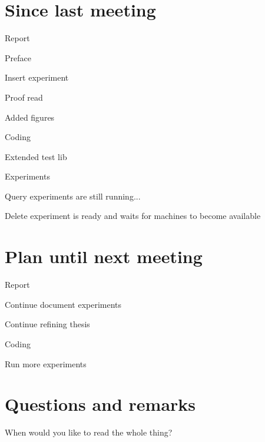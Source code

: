 \documentclass[a4paper,11pt,agenda,chair]{meetingmins}
\begin{document}
\maketitle

\section{Since last meeting}
\begin{items}
\item Report
	\begin{items}
		\item Preface
		\item Insert experiment
		\item Proof read
		\item Added figures
	\end{items}
\item Coding
	\begin{items}
		\item Extended test lib
	\end{items}
\item Experiments
	\begin{items}
		\item Query experiments are still running...
		\item Delete experiment is ready and waits for machines to become available
	\end{items}
\end{items}

\section{Plan until next meeting}
\begin{items}
\item Report
	\begin{items}
		\item Continue document experiments
		\item Continue refining thesis
	\end{items}
\item Coding
	\begin{items}
		\item Run more experiments
	\end{items}
\end{items}

\section{Questions and remarks}
\begin{items}
	\item When would you like to read the whole thing?
\end{items}
\end{document}
